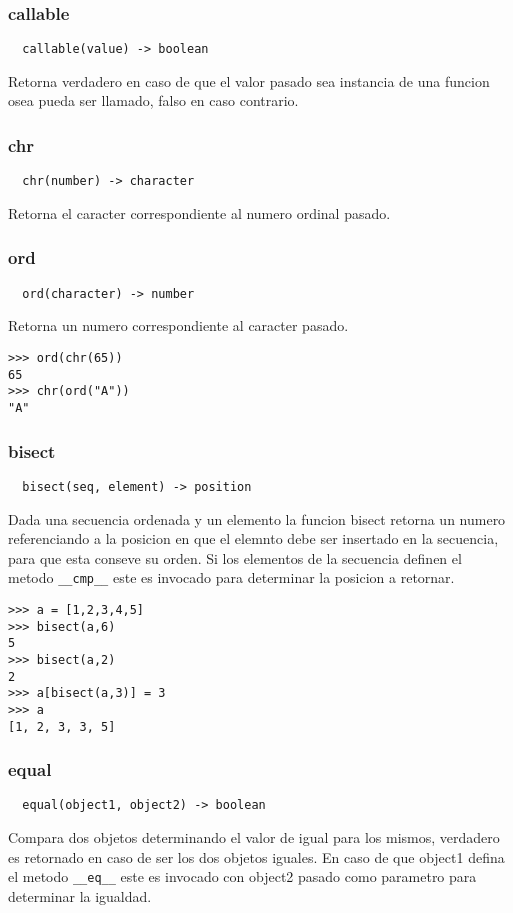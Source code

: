 \subsubsection*{callable}
\begin{verbatim}
  callable(value) -> boolean
\end{verbatim}
Retorna verdadero en caso de que el valor pasado sea instancia de una funcion
osea pueda ser llamado, falso en caso contrario.

\subsubsection*{chr}
\begin{verbatim}
  chr(number) -> character
\end{verbatim}
Retorna el caracter correspondiente al numero ordinal pasado.

\subsubsection*{ord}
\begin{verbatim}
  ord(character) -> number
\end{verbatim}
Retorna un numero correspondiente al caracter pasado.
\begin{lstlisting}[style=consola]
>>> ord(chr(65))
65
>>> chr(ord("A"))
"A"
\end{lstlisting}

\subsubsection*{bisect}
\begin{verbatim}
  bisect(seq, element) -> position
\end{verbatim}
Dada una secuencia ordenada y un elemento la funcion bisect retorna un numero
referenciando a la posicion en que el elemnto debe ser insertado en la
secuencia, para que esta conseve su orden.
Si los elementos de la secuencia definen el metodo \verb|__cmp__| este es
invocado para determinar la posicion a retornar.
\begin{lstlisting}[style=consola]
>>> a = [1,2,3,4,5]
>>> bisect(a,6)
5
>>> bisect(a,2)
2
>>> a[bisect(a,3)] = 3
>>> a
[1, 2, 3, 3, 5]
\end{lstlisting}

\subsubsection*{equal}
\begin{verbatim}
  equal(object1, object2) -> boolean
\end{verbatim}
Compara dos objetos determinando el valor de igual para los mismos, verdadero es
retornado en caso de ser los dos objetos iguales.
En caso de que object1 defina el metodo \verb|__eq__| este es invocado con
object2
pasado como parametro para determinar la igualdad.

